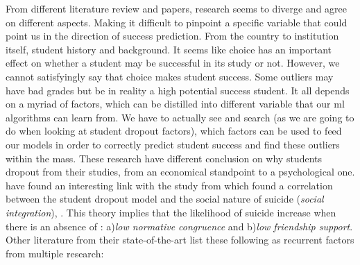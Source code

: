 \documentclass[../../main.tex]{subfiles}
\begin{document}
From different literature review and papers, research seems to diverge and agree on different aspects. Making it difficult to pinpoint a specific variable that could point us in the direction of success prediction. From the country to institution itself, student history and background. It seems like choice has an important effect on whether a student may be successful in its study or not. However, we cannot satisfyingly say that choice makes student success.  Some outliers may have bad grades but be in reality a high potential success student. It all depends on a myriad of factors, which can be distilled into different variable that our \acrfull{ml} algorithms can learn from. We have to actually see and search (as we are going to do when looking at student dropout factors), which factors can be used to feed our models in order to correctly predict student success and find these outliers within the mass.\cite{kuh_what_2006, sa_how_2018}
These research have different conclusion on why students dropout from their studies, from an economical standpoint to a psychological one.\cite{opazo_analysis_2021} have found an interesting link with the study from\cite{spady_dropouts_1970} which found a correlation between the student dropout model and the social nature of suicide (\textit{social integration}), \cite{durkheim_suicide_1951}. This theory implies that the likelihood of suicide increase when there is an absence of : a)\textit{low normative congruence} and b)\textit{low friendship support}. Other literature from their state-of-the-art list these following as recurrent factors from multiple research\cite{opazo_analysis_2021,tinto_dropout_1975,caspersen_teachers_2015,lidia_problema_2006,bejarano_caso_2017,sinchi_acceso_2018,cavero_voluntad_2011,velasco_alisis_nodate}: 
\end{document}
